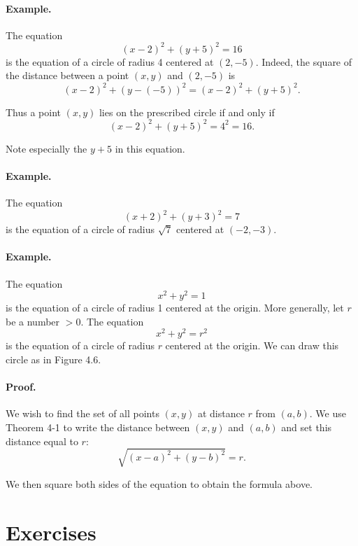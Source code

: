 \documentclass[12pt]{book} %
\begin{document}
\paragraph{Example.}
The equation
\[
(x-2)^2+(y+5)^2=16
\]
is the equation of a circle of radius 4 centered at $(2,-5)$. Indeed, the square of the distance between a point $(x,y)$ and $(2,-5)$ is
\[
(x-2)^2+(y-(-5))^2=(x-2)^2+(y+5)^2.
\]

Thus a point $(x,y)$ lies on the prescribed circle if and only if
\[
(x-2)^2+(y+5)^2=4^2=16.
\]

Note especially the $y+5$ in this equation.

\paragraph{Example.}
The equation
\[
(x+2)^2+(y+3)^2=7
\]
is the equation of a circle of radius $\sqrt{7}$ centered at $(-2,-3)$.

\paragraph{Example.}
The equation
\[
x^2+y^2=1
\]
is the equation of a circle of radius 1 centered at the origin. More generally, let $r$ be a number $>0$. The equation
\[
x^2+y^2=r^2
\]
is the equation of a circle of radius $r$ centered at the origin. We can draw this circle as in Figure 4.6.



\paragraph{Proof.}
We wish to find the set of all points $(x,y)$ at distance $r$ from $(a,b)$. We use Theorem 4-1 to write the distance between $(x,y)$ and $(a,b)$ and set this distance equal to $r$:
\[
\sqrt{(x-a)^2+(y-b)^2}=r.
\]

We then square both sides of the equation to obtain the formula above.

\section*{Exercises}
\end{document}
